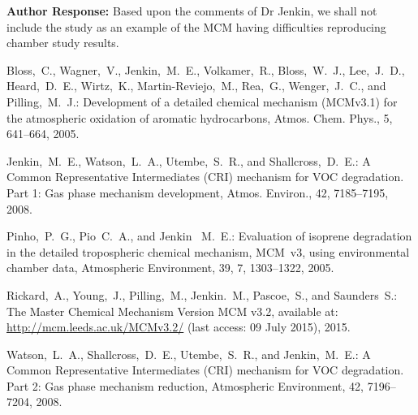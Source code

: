 \documentclass{article}
\begin{document}
\textbf{Author Response:} Based upon the comments of Dr Jenkin, we shall not include the \citet{Pinho:2005} study as an example of the MCM having difficulties reproducing chamber study results.

\begin{thebibliography}{3}

     Bloss,~C., Wagner,~V., Jenkin,~M.~E., Volkamer,~R., Bloss,~W.~J., Lee,~J.~D., Heard,~D.~E., Wirtz,~K., Martin-Reviejo,~M., Rea,~G., Wenger,~J.~C., and Pilling,~M.~J.: Development of a detailed chemical mechanism (MCMv3.1) for the atmospheric oxidation of aromatic hydrocarbons, Atmos. Chem. Phys., 5, 641--664, 2005.

 Jenkin,~M.~E., Watson,~L.~A., Utembe,~S.~R., and Shallcross,~D.~E.: {A Common Representative Intermediates (CRI) mechanism for VOC degradation. Part 1: Gas phase mechanism development}, Atmos. Environ., 42, 7185--7195, 2008.

     Pinho,~P.~G., Pio~C.~A., and Jenkin~ M.~E.: Evaluation of isoprene degradation in the detailed tropospheric chemical mechanism, MCM~v3, using environmental chamber data, Atmospheric Environment, 39, 7, 1303--1322, 2005.

     Rickard,~A., Young,~J., Pilling,~M., Jenkin.~M., Pascoe,~S., and Saunders~S.: {The Master Chemical Mechanism Version MCM v3.2}, available at: \url{http://mcm.leeds.ac.uk/MCMv3.2/} (last access: 09 July 2015), 2015.

     Watson,~L.~A., Shallcross,~D.~E., Utembe,~S.~R., and Jenkin,~M.~E.: A Common Representative Intermediates (CRI) mechanism for VOC degradation. Part 2: Gas phase mechanism reduction, Atmospheric Environment, 42, 7196--7204, 2008.

\end{thebibliography}
\end{document}
